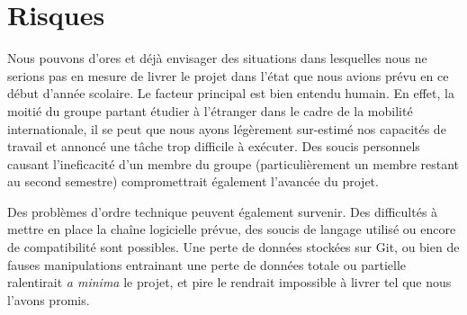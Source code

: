 \chapter{Risques}
	Nous pouvons d'ores et déjà envisager des situations dans lesquelles nous ne serions pas en mesure de livrer le projet dans l'état que nous avions prévu en ce début d'année scolaire.
	Le facteur principal est bien entendu humain. En effet, la moitié du groupe partant étudier à l'étranger dans le cadre de la mobilité internationale, il se peut que nous ayons légèrement sur-estimé nos capacités de travail et annoncé une tâche trop difficile à exécuter. Des soucis personnels causant l'ineficacité d'un membre du groupe (particulièrement un membre restant au second semestre) compromettrait également l'avancée du projet.

	Des problèmes d'ordre technique peuvent également survenir. Des difficultés à mettre en place la chaîne logicielle prévue, des soucis de langage utilisé ou encore de compatibilité sont possibles.
	Une perte de données stockées sur Git, ou bien de fauses manipulations entrainant une perte de données totale ou partielle ralentirait \textit{a minima} le projet, et pire le rendrait impossible à livrer tel que nous l'avons promis.